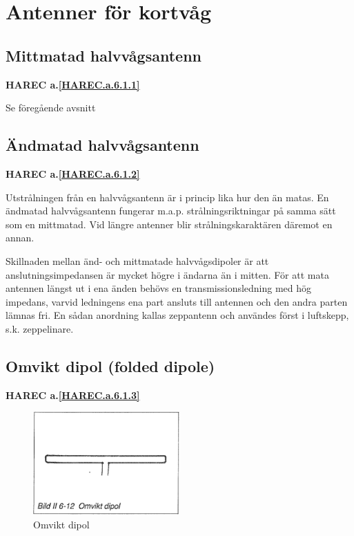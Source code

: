 \section{Antenner för kortvåg}

\subsection{Mittmatad halvvågsantenn}
\textbf{
HAREC a.\ref{HAREC.a.6.1.1}\label{myHAREC.a.6.1.1}
}

Se föregående avsnitt

\subsection{Ändmatad halvvågsantenn}
\textbf{
HAREC a.\ref{HAREC.a.6.1.2}\label{myHAREC.a.6.1.2}
}

Utstrålningen från en halvvågsantenn är i princip lika hur den än
matas. En ändmatad halvvågsantenn fungerar m.a.p. strålningsriktningar
på samma sätt som en mittmatad. Vid längre antenner blir
strålningskaraktären däremot en annan.

Skillnaden mellan änd- och mittmatade halvvågsdipoler är att
anslutningsimpedansen är mycket högre i ändarna än i mitten. För att
mata antennen längst ut i ena änden behövs en transmissionsledning med
hög impedans, varvid ledningens ena part ansluts till antennen och den
andra parten lämnas fri. En sådan anordning kallas zeppantenn och
användes först i luftskepp, s.k. zeppelinare.


\subsection{Omvikt dipol (folded dipole)}
\textbf{
HAREC a.\ref{HAREC.a.6.1.3}\label{myHAREC.a.6.1.3}
}

\begin{figure}
  \includegraphics[width=0.5\textwidth]{images/bild_2_6-12}
  \caption{Omvikt dipol}
  \label{fig:bildII6-12}
\end{figure}

